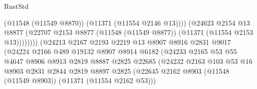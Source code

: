 \begin{lexlean}{RustStd}
\begin{coremodule}
                                              (@11548 (@11549 @8870))
                                              (@11371 (@11554 @2146 @13))))
                                          (@24623
                                            @2154
                                            @13
                                            @8877
                                            (@22707
                                              @2153
                                              @8877
                                              (@11548 (@11549 @8877))
                                              (@11371 (@11554 @2153 @13))))))))
                                  (@24213
                                    @2167
                                    @2193
                                    @2219
                                    @13
                                    @8907
                                    @8916
                                    @2831
                                    @9017
                                    (@24224
                                      @2166
                                      @489
                                      @19132
                                      @8907
                                      @8914
                                      @6182
                                      (@24233
                                        @2165
                                        @53
                                        @55
                                        @4647
                                        @8906
                                        @8913
                                        @2819
                                        @8887
                                        @2825
                                        @22685
                                        (@24232
                                          @2163
                                          @103
                                          @53
                                          @16
                                          @8903
                                          @2831
                                          @2844
                                          @2819
                                          @8897
                                          @2825
                                          (@22645
                                            @2162
                                            @8903
                                            (@11548 (@11549 @8903))
                                            (@11371 (@11554 @2162 @53)))

\end{coremodule}
\end{lexlean}
